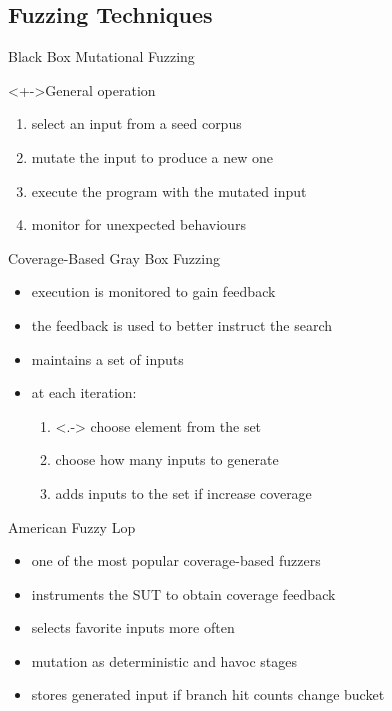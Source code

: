 \documentclass{beamer}
\begin{document}
\subsection{Fuzzing Techniques}

\begin{frame}{Black Box Mutational Fuzzing}
    \begin{block}<+->{General operation}
        \begin{enumerate}[<+->]
            \item{} select an input from a seed corpus
            \item{} mutate the input to produce a new one
            \item{} execute the program with the mutated input
            \item{} monitor for unexpected behaviours
        \end{enumerate}
    \end{block}
\end{frame}

\begin{frame}{Coverage-Based Gray Box Fuzzing}
    \begin{itemize}[<+->]
        \item{} execution is monitored to gain feedback
        \item{} the feedback is used to better instruct the search
        \item{} maintains a set of inputs
        \item{} at each iteration:
            \begin{enumerate}
                \item<.-> choose element from the set
                \item{} choose how many inputs to generate
                \item{} adds inputs to the set if increase coverage
            \end{enumerate}
    \end{itemize}
\end{frame}

\begin{frame}{American Fuzzy Lop}
    \begin{itemize}[<+->]
        \item{} one of the most popular coverage-based fuzzers
        \item{} instruments the SUT to obtain coverage feedback
        \item{} selects favorite inputs more often
        \item{} mutation as deterministic and havoc stages
        \item{} stores generated input if branch hit counts change bucket
    \end{itemize}
\end{frame}
\end{document}

